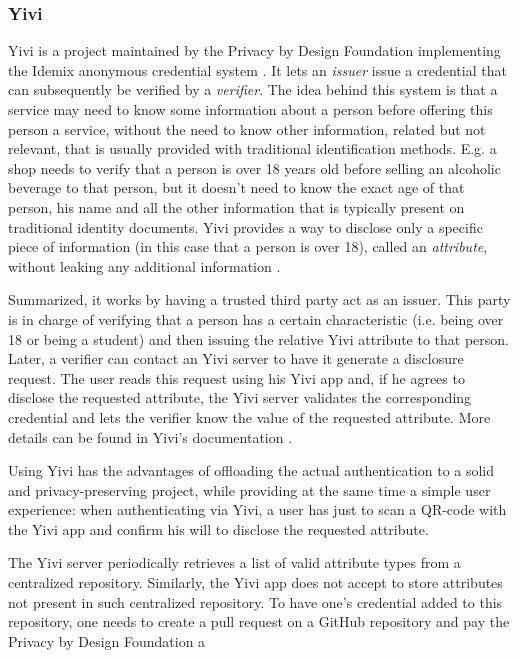 \documentclass{report}
\begin{document}
\subsubsection{Yivi} \label{yivi}
Yivi is a project maintained by the Privacy by Design Foundation \cite{privacybydesignfoundation} implementing the Idemix anonymous credential system \cite{idemix_specification}. It
lets an \textit{issuer} issue a credential that can subsequently be verified by a \textit{verifier}. The idea behind this system is that a service may need to know some
information about a person before offering this person a service, without the need to know other information, related but not relevant, that is usually provided with traditional
identification methods. E.g. a shop needs to verify that a person is over 18 years old before selling an alcoholic beverage to that person, but it doesn't need to know the exact age of
that person, his name and all the other information that is typically present on traditional identity documents. Yivi provides a way to disclose only a specific piece of
information (in this case that a person is over 18), called an \textit{attribute}, without leaking any additional information \cite{irma-docs}. \par
Summarized, it works by having a trusted third party act as an issuer. This party is in charge of verifying that a person has a certain characteristic (i.e. being over 18 or being
a student) and then issuing the relative Yivi attribute to that person. Later, a verifier can contact an Yivi server to have it generate a disclosure request. The user reads this
request using his Yivi app and, if he agrees to disclose the requested attribute, the Yivi server validates the corresponding credential and lets the verifier know the value of the
requested attribute. More details can be found in Yivi's documentation \cite{irma-docs}. \par
Using Yivi has the advantages of offloading the actual authentication to a solid and privacy-preserving project, while providing at the same time a simple user experience: when
authenticating via Yivi, a user has just to scan a QR-code with the Yivi app and confirm his will to disclose the requested attribute. \par
The Yivi server periodically retrieves a list of valid attribute types from a centralized repository. Similarly, the Yivi app does not accept to store attributes not present in such
centralized repository. To have one's credential added to this repository, one needs to create a pull request on a GitHub repository and pay the Privacy by Design Foundation a
\end{document}
